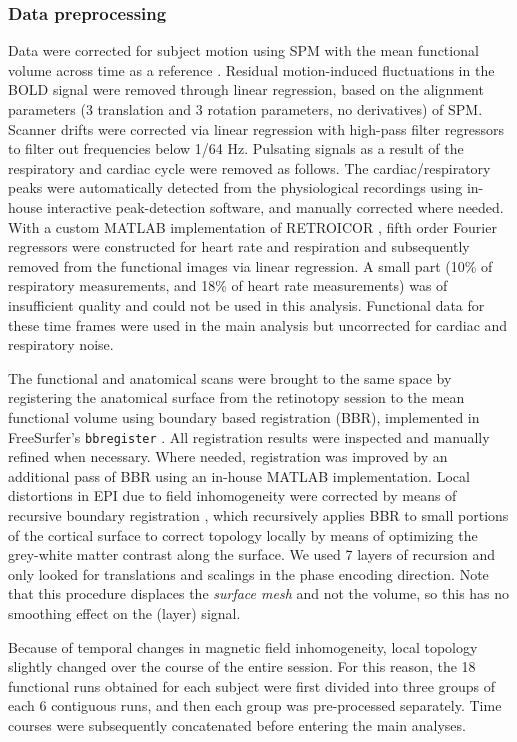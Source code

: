\documentclass[9pt,lineno]{aperture}
\begin{document}
\subsubsection{Data preprocessing}
Data were corrected for subject motion using SPM with the mean functional volume across time as a reference \cite{Friston1995}. Residual motion-induced fluctuations in the BOLD signal were removed through linear regression, based on the alignment parameters (3 translation and 3 rotation parameters, no derivatives) of SPM. Scanner drifts were corrected via linear regression with high-pass filter regressors to filter out frequencies below 1/64 Hz. Pulsating signals as a result of the respiratory and cardiac cycle were removed as follows. The cardiac/respiratory peaks were automatically detected from the physiological recordings using in-house interactive peak-detection software, and manually corrected where needed. With a custom MATLAB implementation of RETROICOR \citep{Glover2000}, fifth order Fourier regressors were constructed for heart rate and respiration and subsequently removed from the functional images via linear regression. A small part (10\% of respiratory measurements, and 18\% of heart rate measurements) was of insufficient quality and could not be used in this analysis. Functional data for these time frames were used in the main analysis but uncorrected for cardiac and respiratory noise.

The functional and anatomical scans were brought to the same space by registering the anatomical surface from the retinotopy session to the mean functional volume using boundary based registration (BBR), implemented in FreeSurfer's \texttt{bbregister} \citep{Greve2009}. All registration results were inspected and manually refined when necessary. Where needed, registration was improved by an additional pass of BBR using an in-house MATLAB implementation. Local distortions in EPI due to field inhomogeneity were corrected by means of recursive boundary registration \citep{VanMourik2019}, which recursively applies BBR to small portions of the cortical surface to correct topology locally by means of optimizing the grey-white matter contrast along the surface. We used 7 layers of recursion and only looked for translations and scalings in the phase encoding direction. Note that this procedure displaces the \textit{surface mesh} and not the volume, so this has no smoothing effect on the (layer) signal. 

Because of temporal changes in magnetic field inhomogeneity, local topology slightly changed over the course of the entire session. For this reason, the 18 functional runs obtained for each subject were first divided into three groups of each 6 contiguous runs, and then each group was pre-processed separately. Time courses were subsequently concatenated before entering the main analyses.
\end{document}
